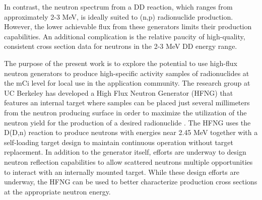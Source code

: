 \documentclass[5p]{elsarticle}
\begin{document}
In contrast,  the neutron spectrum from a DD reaction, which ranges from approximately 2-3 MeV, is ideally suited to (n,p) radionuclide production.
However, the lower achievable flux from these generators limits their production capabilities.
 An additional complication is the relative paucity of high-quality, consistent cross section data for neutrons in the 2-3 MeV DD energy range.
 

The purpose of the present work is to explore the potential to use high-flux neutron generators to produce high-specific activity samples of radionuclides at the mCi level for local use in the application community. 
 The research group at UC Berkeley has  developed a High Flux Neutron Generator (HFNG) that features an internal target where samples can be placed just several millimeters from the neutron producing surface in order to maximize the utilization of the neutron yield for the production of a desired radionuclide \cite{Waltz2017,Waltz2016a}.
 The HFNG uses the D(D,n) reaction to produce neutrons with energies near 2.45 MeV together with a self-loading target design to maintain continuous operation without target replacement.
 In addition to the generator itself, efforts are underway to design neutron reflection capabilities to allow scattered neutrons multiple opportunities to interact with an  internally mounted target.
While these design efforts are underway, the HFNG can be used to better characterize production cross sections at the appropriate neutron energy.
\end{document}
